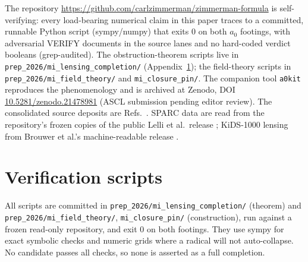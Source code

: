 \documentclass[11pt]{article}
\begin{document}
The repository \url{https://github.com/carlzimmerman/zimmerman-formula} is self-verifying: every load-bearing numerical claim in this paper traces to a committed, runnable Python script (sympy/numpy) that exits 0 on both $a_0$ footings, with adversarial VERIFY documents in the source lanes and no hard-coded verdict booleans (grep-audited). The obstruction-theorem scripts live in \texttt{prep\_2026/mi\_lensing\_completion/} (Appendix~\ref{app:scripts}); the field-theory scripts in \texttt{prep\_2026/mi\_field\_theory/} and \texttt{mi\_closure\_pin/}. The companion tool \texttt{a0kit} reproduces the phenomenology and is archived at Zenodo, DOI \href{https://doi.org/10.5281/zenodo.21478981}{10.5281/zenodo.21478981} (ASCL submission pending editor review). The consolidated source deposits are Refs.~\cite{zft,zftE,zconcept,znogoL,zhonest}. SPARC data are read from the repository's frozen copies of the public Lelli et al.\ release \cite{lelli2016}; KiDS-1000 lensing from Brouwer et al.'s machine-readable release \cite{brouwer2021}.

\appendix

\section{Verification scripts}\label{app:scripts}

All scripts are committed in \texttt{prep\_2026/mi\_lensing\_completion/} (theorem) and \texttt{prep\_2026/mi\_field\_theory/}, \texttt{mi\_closure\_pin/} (construction), run against a frozen read-only repository, and exit 0 on both footings. They use sympy for exact symbolic checks and numeric grids where a radical will not auto-collapse. No candidate passes all checks, so none is asserted as a full completion.
\end{document}
